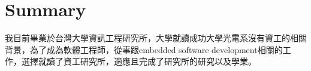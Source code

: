 \section{Summary}
\begin{CJK*}{UTF8}{bsmi}我目前畢業於台灣大學資訊工程研究所，大學就讀成功大學光電系沒有資工的相關背景，為了成為軟體工程師，從事跟embedded software development相關的工作，選擇就讀了資工研究所，適應且完成了研究所的研究以及學業。
\end{CJK*}
